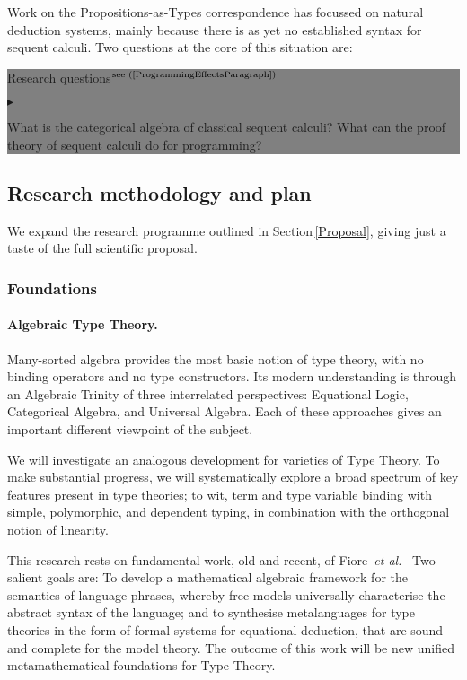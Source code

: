 \documentclass[11pt,twocolumn]{article}
\newenvironment{btritemize}
  {\begin{list}{\btr}
  {\setlength{\topsep}{2pt}
   \setlength{\partopsep}{2pt}
   \setlength{\itemsep}{2.5pt}
   \setlength{\parsep}{2.5pt}
   \setlength{\leftmargin}{1em}
   \setlength{\labelwidth}{.5em}}}
  {\end{list}}
\newcommand{\mytextsf}[1]{\textsf{\small #1}}
\newcommand{\hl}[1]{#1}%
\newcommand{\etal}{\emph{et al.}}
\newcommand{\btr}{$\blacktriangleright$}
\newcommand{\reqpsize}{8.113395cm}%
\newcommand{\req}[2]{\begin{center}\colorbox{grey}{\begin{minipage}{\reqpsize} 
  \mytextsf{Research question}\hfill$^{\mbox{\scriptsize see (#1) }}$\\[-5.5mm]
  \begin{btritemize}
  \item #2
  \end{btritemize}
\end{minipage}}\end{center}}
\newcommand{\reqs}[2]{\begin{center}\colorbox{grey}{\begin{minipage}{\reqpsize}
  \mytextsf{Research questions}\hfill$^{\mbox{\scriptsize see (#1) }}$\\[-5.5mm]
  \begin{btritemize}
  \item #2
  \end{btritemize}
\end{minipage}}\end{center}}
\begin{document}
Work on the Propositions-as-Types correspondence has focussed on natural
deduction systems, mainly because there is as yet no established syntax for
sequent calculi.  Two questions at the core of this situation are:
%
\reqs{\ref{ProgrammingEffectsParagraph}}
  {What is the categorical algebra of classical sequent calculi? %
%
  What can the proof theory of sequent calculi do for programming?}

\subsection{Research methodology and plan}

We expand the research programme outlined in Section\,\ref{Proposal}, giving
just a taste of the full scientific proposal.

\subsubsection{Foundations}
\label{Foundations}

\paragraph{Algebraic Type Theory.}
\label{AlgebraicTypeTheoryParagraph}

Many-sorted algebra provides the most basic notion of type theory, with no
binding operators and no type constructors.  Its modern understanding is
through an Algebraic Trinity of three interrelated perspectives: Equational
Logic, Categorical Algebra, and Universal Algebra.
Each of these approaches gives an important different viewpoint of the
subject.

We will \hl{investigate} an analogous development for varieties of Type
Theory.  To make substantial prog\-ress, we will systematically explore a broad
spectrum of key features present in type theories; to wit, term and type
variable binding with simple, polymorphic, and dependent typing, in
combination with the orthogonal notion of linearity.  

This research rests on fundamental work, old and recent, of
Fiore~\etal\
Two salient \hl{goals} are: To develop a mathematical algebraic framework
for the semantics of language phrases, whereby free models universally
characterise the abstract syntax of the language; and to synthesise
metalanguages for type theories in the form of formal systems for equational
deduction, that are sound and complete for the model theory.  The outcome of
this work will be new unified metamathematical foundations for Type Theory.
\end{document}
